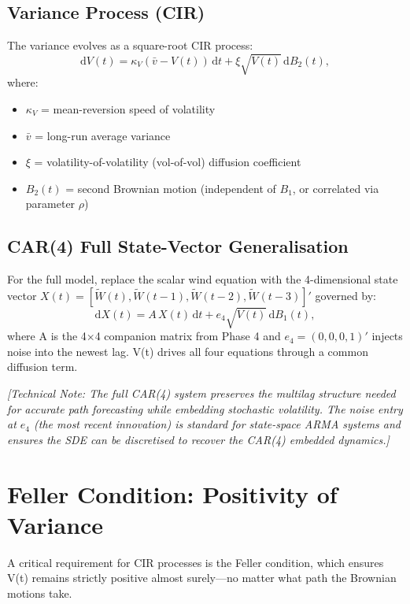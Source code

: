 \documentclass[11pt, a4paper, twoside]{article}
\begin{document}
\subsection{Variance Process (CIR)}

The variance evolves as a square-root CIR process:
\begin{equation}
\mathrm{d}V(t) = \kappa_V (\bar{v} - V(t)) \, \mathrm{d}t + \xi \sqrt{V(t)} \, \mathrm{d}B_2(t),
\end{equation}
where:
\begin{itemize}
\item $\kappa_V$ = mean-reversion speed of volatility
\item $\bar{v}$ = long-run average variance
\item $\xi$ = volatility-of-volatility (vol-of-vol) diffusion coefficient
\item $B_2(t)$ = second Brownian motion (independent of $B_1$, or correlated via parameter $\rho$)
\end{itemize}

\subsection{CAR(4) Full State-Vector Generalisation}

For the full model, replace the scalar wind equation with the 4-dimensional state vector $X(t) = [\tilde{W}(t), \tilde{W}(t-1), \tilde{W}(t-2), \tilde{W}(t-3)]'$ governed by:
\begin{equation}
\mathrm{d}X(t) = A \, X(t) \, \mathrm{d}t + e_4 \sqrt{V(t)} \, \mathrm{d}B_1(t),
\end{equation}
where A is the 4×4 companion matrix from Phase 4 and $e_4 = (0, 0, 0, 1)'$ injects noise into the newest lag. V(t) drives all four equations through a common diffusion term.

\textit{[Technical Note: The full CAR(4) system preserves the multilag structure needed for accurate path forecasting while embedding stochastic volatility. The noise entry at $e_4$ (the most recent innovation) is standard for state-space ARMA systems and ensures the SDE can be discretised to recover the CAR(4) embedded dynamics.]}

\section{Feller Condition: Positivity of Variance}

A critical requirement for CIR processes is the Feller condition, which ensures V(t) remains strictly positive almost surely---no matter what path the Brownian motions take.
\end{document}
